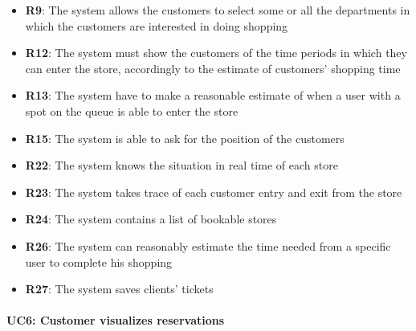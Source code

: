 \documentclass{article}
\begin{document}
\begin{center}
\begin{itemize}
					\item {\bfseries R9}: The system allows the customers to select some or all the departments in which the customers are interested in doing shopping
					\item {\bfseries R12}: The system must show the customers of the time periods in which they can
					enter the store, accordingly to the estimate of customers' shopping time
					\item {\bfseries R13}: The system have to make a reasonable estimate of when a user with a spot on the queue is able to enter the store
					\item {\bfseries R15}: The system is able to ask for the position of the customers
					\item {\bfseries R22}: The system knows the situation in real time of each store
					\item {\bfseries R23}: The system takes trace of each customer entry and exit from the store
					\item {\bfseries R24}: The system contains a list of bookable stores
					\item {\bfseries R26}: The system can reasonably estimate the time needed from a specific user to complete his shopping
					\item {\bfseries R27}: The system saves clients' tickets


					\end{itemize}
				\end{center}
			
			\paragraph{UC6: Customer visualizes reservations}
			
\end{document}
